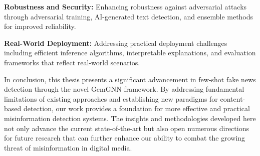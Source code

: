 \textbf{Robustness and Security:} Enhancing robustness against adversarial attacks through adversarial training, AI-generated text detection, and ensemble methods for improved reliability.

\textbf{Real-World Deployment:} Addressing practical deployment challenges including efficient inference algorithms, interpretable explanations, and evaluation frameworks that reflect real-world scenarios.

In conclusion, this thesis presents a significant advancement in few-shot fake news detection through the novel GemGNN framework. By addressing fundamental limitations of existing approaches and establishing new paradigms for content-based detection, our work provides a foundation for more effective and practical misinformation detection systems. The insights and methodologies developed here not only advance the current state-of-the-art but also open numerous directions for future research that can further enhance our ability to combat the growing threat of misinformation in digital media.

\EndChapter

